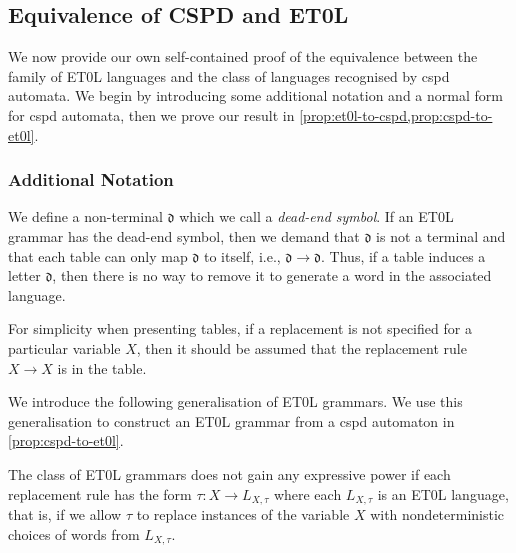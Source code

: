 \subsection{Equivalence of CSPD and ET0L}\label{sec:machine equivalence}

We now provide our own self-contained proof of the equivalence between the family of ET0L languages and the class of languages recognised by cspd automata.
We begin by introducing some additional notation and a normal form for cspd automata,
then we prove our result in \cref{prop:et0l-to-cspd,prop:cspd-to-et0l}.

\subsubsection{Additional Notation}\label{sec:cspd-additional-notation}

We define a non-terminal $\mathfrak{d}$ which we call a \emph{dead-end symbol}.
If an ET0L grammar has the dead-end symbol, then we demand that $\mathfrak{d}$ is not a terminal and that each table can only map $\mathfrak{d}$ to itself, i.e., $\mathfrak{d} \to \mathfrak{d}$.
Thus, if a table induces a letter $\mathfrak{d}$, then there is no way to remove it to generate a word in the associated language.

For simplicity when presenting tables, if a replacement is not specified for a particular variable $X$, then it should be assumed that the replacement rule $X \to X$ is in the table.

We introduce the following generalisation of ET0L grammars.
We use this generalisation to construct an ET0L grammar from a cspd automaton in \cref{prop:cspd-to-et0l}.

\begin{lemma}\label{lemma:et0l-regular-replacements}
	The class of ET0L grammars does not gain any expressive power if each replacement rule has the form
	$
		\tau : X \to L_{X,\tau}
	$
	where each $L_{X,\tau}$ is an ET0L language, that is, if we allow $\tau$ to replace instances of the variable $X$ with nondeterministic choices of words from $L_{X,\tau}$.
\end{lemma}

